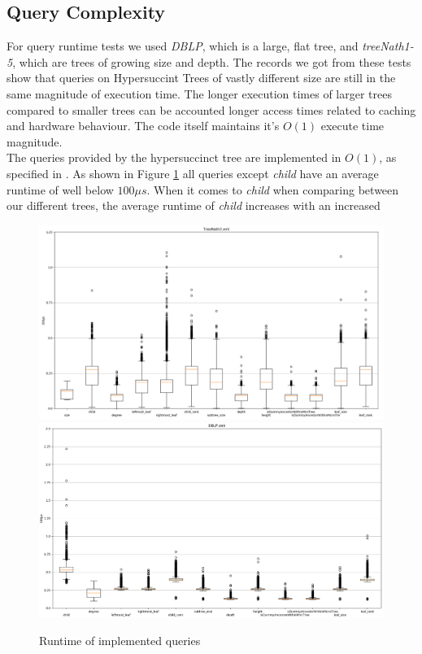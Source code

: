 \documentclass{article}
\begin{document}
\subsection{Query Complexity} \label{Query Complexity}
For query runtime tests we used \textit{DBLP}, which is a large, flat tree, and \textit{treeNath1-5}, which are trees of growing size and depth. The records we got from these tests show that queries on Hypersuccint Trees of vastly different size are still in the same magnitude of execution time. The longer execution times of larger trees compared to smaller trees can be accounted longer access times related to caching and hardware behaviour. The code itself maintains it's $O(1)$ execute time magnitude.\\
The queries provided by the hypersuccinct tree are implemented in $O(1)$, as specified in
\cite{farzanMunro}. As shown in Figure \ref{complexQue:image2} all queries except \textit{child} have an average runtime of well below $100 \mu s$. When it comes to \textit{child} when comparing between our different trees, the average runtime of \textit{child} increases with an increased 
\begin{figure}[H]
\includegraphics[scale=0.3]{treeNath3_Queries}
\includegraphics[scale=0.3]{DBLP_Queries}
\caption{Runtime of implemented queries}
\label{complexQue:image2}
\end{figure}
\end{document}
